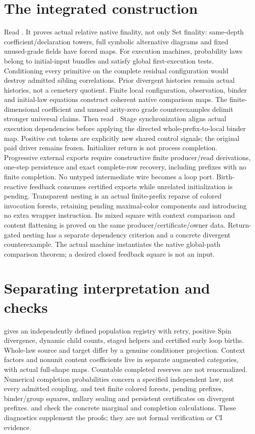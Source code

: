 \documentclass{article}
\begin{document}
\section{The integrated construction}
Read . It proves actual relative native finality, not only Set finality: same-depth coefficient/declaration towers, full symbolic alternative diagrams and fixed unused-grade fields have forced maps. For execution machines, probability laws belong to initial-input bundles and satisfy global first-execution tests. Conditioning every primitive on the complete residual configuration would destroy admitted sibling correlations. Prior divergent histories remain actual histories, not a cemetery quotient. Finite local configuration, observation, binder and initial-law equations construct coherent native comparison maps. The finite-dimensional coefficient and unused arity-zero grade counterexamples delimit stronger universal claims.
Then read . Stage synchronization aligns actual execution dependencies before applying the directed whole-prefix-to-local binder map. Positive cut tokens are explicitly new shared control signals; the original paid driver remains frozen. Initializer return is not process completion. Progressive external exports require constructive finite producer/read derivations, one-step persistence and exact complete-row recovery, including prefixes with no finite completion. No untyped intermediate wire becomes a loop port.
Birth-reactive feedback consumes certified exports while unrelated initialization is pending. Transparent nesting is an actual finite-prefix reparse of colored invocation forests, retaining pending maximal-color components and introducing no extra wrapper instruction. Its mixed square with context comparison and content flattening is proved on the same producer/certificate/owner data. Return-gated nesting has a separate dependency criterion and a concrete divergent counterexample. The actual machine instantiates the native global-path comparison theorem; a desired closed feedback square is not an input.
\section{Separating interpretation and checks}
 gives an independently defined population registry with retry, positive Spin divergence, dynamic child counts, staged helpers and certified early loop births. Whole-law source and target differ by a genuine conditioner projection. Context factors and nonunit content coefficients live in separate augmented categories, with actual full-shape maps. Countable completed reserves are not renormalized. Numerical completion probabilities concern a specified independent law, not every admitted coupling.
 and  test finite colored forests, pending prefixes, binder/group squares, nullary sealing and persistent certificates on divergent prefixes.  and  check the concrete marginal and completion calculations. These diagnostics supplement the proofs; they are not formal verification or CI evidence.
\end{document}
